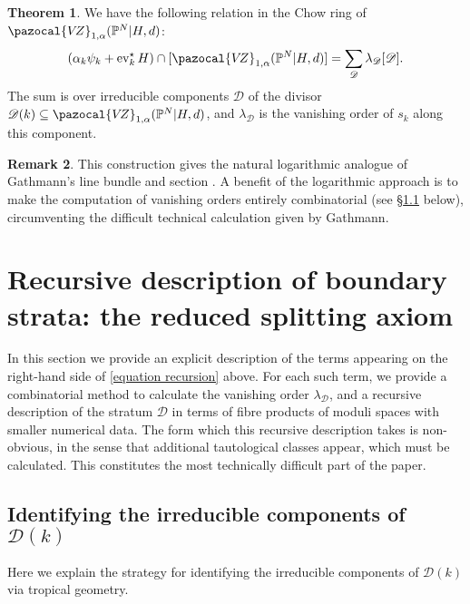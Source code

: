 \documentclass[11pt]{amsart}
\newcommand{\PP}{\mathbb P}
\newcommand{\VZ}{\pazocal{V\!Z}}
\newcommand{\st}{\star}
\newcommand{\ev}{\operatorname{ev}}
\newcommand{\Dcal}{\mathcal{D}}
\theoremstyle{definition}
\newtheorem{thm}{Theorem}[section]
\theoremstyle{definition}
\newtheorem{remark}[thm]{Remark}
\begin{document}
\begin{thm} \label{theorem recursion} We have the following relation in the Chow ring of $\VZ_{1,\alpha}(\PP^N|H,d)$:
\begin{equation}\label{equation recursion} (\alpha_k \psi_k + \ev_k^\st H) \cap [\VZ_{1,\alpha}(\PP^N|H,d)] = \sum_{\Dcal} \lambda_\Dcal [ \Dcal ].\end{equation}
The sum is over irreducible components $\Dcal$ of the divisor $\Dcal(k) \subseteq \VZ_{1,\alpha}(\PP^N|H,d)$, and $\lambda_\Dcal$ is the vanishing order of $s_k$ along this component. \end{thm}

\begin{remark} This construction gives the natural logarithmic analogue of Gathmann's line bundle and section \cite[Construction 2.1]{Ga}. A benefit of the logarithmic approach is to make the computation of vanishing orders entirely combinatorial (see \S \ref{} below), circumventing the difficult technical calculation given by Gathmann. \end{remark}

\section{Recursive description of boundary strata: the reduced splitting axiom}
In this section we provide an explicit description of the terms appearing on the right-hand side of \eqref{equation recursion} above. For each such term, we provide a combinatorial method to calculate the vanishing order $\lambda_\Dcal$, and a recursive description of the stratum $\Dcal$ in terms of fibre products of moduli spaces with smaller numerical data. The form which this recursive description takes is non-obvious, in the sense that additional tautological classes appear, which must be calculated. This constitutes the most technically difficult part of the paper. 


\subsection{Identifying the irreducible components of $\Dcal(k)$} Here we explain the strategy for identifying the irreducible components of $\Dcal(k)$ via tropical geometry.
\end{document}

